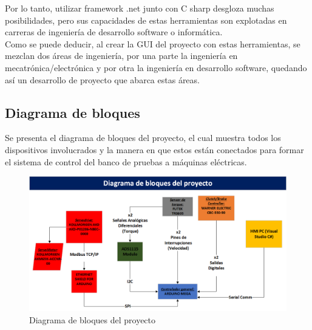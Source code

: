 \documentclass[12pt,titlepage]{article}
\begin{document}
Por lo tanto, utilizar framework .net junto con C sharp desgloza muchas posibilidades, pero sus capacidades de estas herramientas son explotadas en carreras de ingeniería de desarrollo software o informática. \\

Como se puede deducir, al crear la GUI del proyecto con estas herramientas, se mezclan dos áreas de ingeniería, por una parte la ingeniería en mecatrónica/electrónica y por otra la ingeniería en desarrollo software, quedando así un desarrollo de proyecto que abarca estas áreas. \\  

\newpage

\subsection{Diagrama de bloques}
Se presenta el diagrama de bloques del proyecto, el cual muestra todos los dispositivos involucrados  y la manera en que estos están conectados para formar el sistema de control del banco de pruebas a máquinas eléctricas. \\ 

 \begin{figure}[htbp]
\hspace*{1.1cm} 
\includegraphics[scale=0.58]{bloques_diagram}
\caption{Diagrama de bloques del proyecto}
\end{figure}
\end{document}
